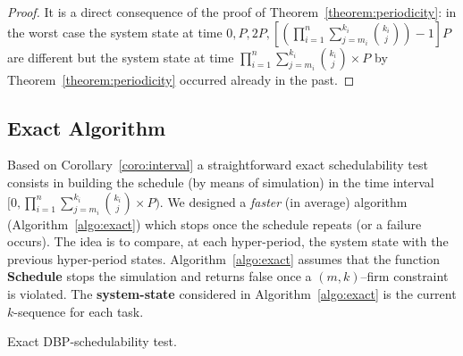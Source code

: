 \documentclass{article}
\begin{document}
\begin{proof}
It is a direct consequence of the proof of Theorem~\ref{theorem:periodicity}: in the worst case the system state at time $0, P, 2P, \left[(\prod_{i=1}^{n} \sum_{j=m_{i}}^{k_{i}}{k_{i}\choose j}) - 1\right] P$ are different but the system state at time $\prod_{i=1}^{n} \sum_{j=m_{i}}^{k_{i}}{k_{i}\choose j} \times P$ by Theorem~\ref{theorem:periodicity} occurred already in the past.
\end{proof}

\subsection{Exact Algorithm}

Based on Corollary~\ref{coro:interval} a straightforward exact schedulability test consists in building the schedule (by means of simulation) in the time interval $[0, \prod_{i=1}^{n} \sum_{j=m_{i}}^{k_{i}}{k_{i}\choose j} \times P)$. We designed a \emph{faster} (in average) algorithm (Algorithm~\ref{algo:exact}) which stops once the schedule repeats (or a failure occurs). The idea is to compare, at each hyper-period, the system state with the previous hyper-period states. Algorithm~\ref{algo:exact} assumes that the function \textbf{Schedule} stops the simulation and returns false once a $(m,k)$--firm constraint is violated. The \textbf{system-state} considered in Algorithm~\ref{algo:exact} is the current $k$-sequence for each task.

\begin{algorithm}
\caption{Exact DBP-schedulability test.\label{algo:exact}}
\end{algorithm}
\end{document}
